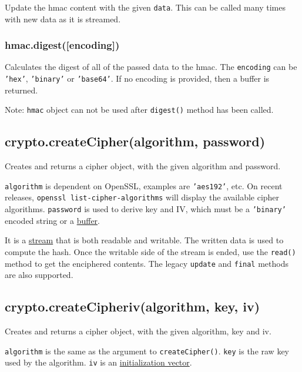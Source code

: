 Update the hmac content with the given \texttt{data}. This can be called
many times with new data as it is streamed.

\subsubsection{hmac.digest({[}encoding{]})}\label{hmac.digestencoding}

Calculates the digest of all of the passed data to the hmac. The
\texttt{encoding} can be \texttt{'hex'}, \texttt{'binary'} or
\texttt{'base64'}. If no encoding is provided, then a buffer is
returned.

Note: \texttt{hmac} object can not be used after \texttt{digest()}
method has been called.

\subsection{crypto.createCipher(algorithm,
password)}\label{crypto.createcipheralgorithm-password}

Creates and returns a cipher object, with the given algorithm and
password.

\texttt{algorithm} is dependent on OpenSSL, examples are
\texttt{'aes192'}, etc. On recent releases,
\texttt{openssl list-cipher-algorithms} will display the available
cipher algorithms. \texttt{password} is used to derive key and IV, which
must be a \texttt{'binary'} encoded string or a
\href{buffer.html}{buffer}.

It is a \href{stream.html}{stream} that is both readable and writable.
The written data is used to compute the hash. Once the writable side of
the stream is ended, use the \texttt{read()} method to get the
enciphered contents. The legacy \texttt{update} and \texttt{final}
methods are also supported.

\subsection{crypto.createCipheriv(algorithm, key,
iv)}\label{crypto.createcipherivalgorithm-key-iv}

Creates and returns a cipher object, with the given algorithm, key and
iv.

\texttt{algorithm} is the same as the argument to
\texttt{createCipher()}. \texttt{key} is the raw key used by the
algorithm. \texttt{iv} is an
\href{http://en.wikipedia.org/wiki/Initialization_vector}{initialization
vector}.

